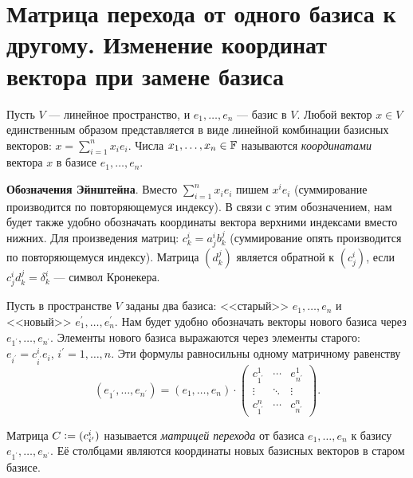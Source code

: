 \section{Матрица перехода от одного базиса к другому. Изменение координат вектора при замене базиса}

\begin{definition}
    Пусть $V$ --- линейное пространство, и $e_1, \ldots, e_n$ --- базис в $V$. Любой вектор $x \in V$ единственным образом представляется в виде линейной комбинации базисных векторов: $x = \sum\limits_{i = 1}^nx_ie_i$. Числа $x_1, \ldots, x_n \in \mathbb{F}$ называются \textit{координатами} вектора $x$ в базисе $e_1, \ldots, e_n$.
\end{definition}

\textbf{Обозначения Эйнштейна}. Вместо $\sum\limits_{i = 1}^nx_ie_i$ пишем $x^ie_i$ (суммирование производится по повторяющемуся индексу). В связи с этим обозначением, нам будет также удобно обозначать координаты вектора верхними индексами вместо нижних. Для произведения матриц: $c^i_k = a^i_jb^j_k$ (суммирование опять производится по повторяющемуся индексу). Матрица $(d^j_k)$ является обратной к $(c^i_j)$, если $c^i_jd^j_k = \delta^i_k$ --- символ Кронекера.

Пусть в пространстве $V$ заданы два базиса: <<старый>> $e_1, \ldots, e_n$ и <<новый>> $e^\prime_1, \ldots, e^\prime_n$. Нам будет удобно обозначать векторы нового базиса через $e_{1^\prime}, \ldots, e_{n^\prime}$. Элементы нового базиса выражаются через элементы старого: $e_{i^\prime} = c^i_{i^\prime}e_i$, $i^\prime = 1, \ldots, n$. Эти формулы равносильны одному матричному равенству
\[
    (e_{1^\prime}, \ldots, e_{n^\prime}) = (e_1, \ldots, e_n) \cdot
    \begin{pmatrix}
        c^1_{1^\prime} & \cdots & e^1_{n^\prime}\\
        \vdots & \ddots & \vdots\\
        c^n_{1^\prime} & \cdots & c^n_{n^\prime}
    \end{pmatrix}.
\]

\begin{definition}
    Матрица $C \vcentcolon = (c^i_{i^\prime})$ называется \textit{матрицей перехода} от базиса $e_1, \ldots, e_n$ к базису $e_{1^\prime}, \ldots, e_{n^\prime}$. Её столбцами являются координаты новых базисных векторов в старом базисе.
\end{definition}

